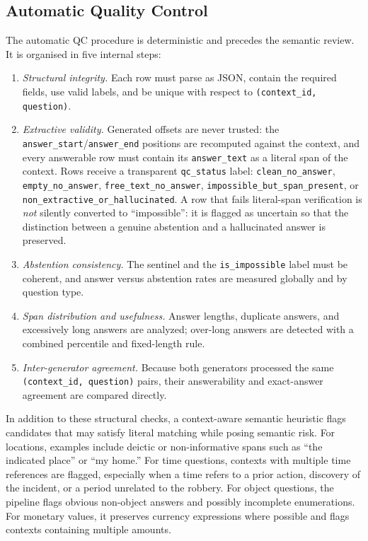 \documentclass[graybox]{SNmult}
\begin{document}
\subsection{Automatic Quality Control}

The automatic QC procedure is deterministic and precedes the semantic review.
It is organised in five internal steps: %

\begin{enumerate}
\item \textit{Structural integrity.} Each row must parse as JSON, contain the
  required fields, use valid labels, and be unique with respect to
  \texttt{(context\_id, question)}.
\item \textit{Extractive validity.} Generated offsets are never trusted: the
  \texttt{answer\_start}/\texttt{answer\_end} positions are recomputed against
  the context, and every answerable row must contain its
  \texttt{answer\_text} as a literal span of the context. Rows receive a
  transparent \texttt{qc\_status} label: \texttt{clean\_no\_answer},
  \texttt{empty\_no\_answer}, \texttt{free\_text\_no\_answer},
  \texttt{impossible\_but\_span\_present}, or
  \texttt{non\_extractive\_or\_hallucinated}. A row that fails literal-span
  verification is \emph{not} silently converted to ``impossible'': it is
  flagged as uncertain so that the distinction between a genuine abstention
  and a hallucinated answer is preserved.
\item \textit{Abstention consistency.} The sentinel and the
  \texttt{is\_impossible} label must be coherent, and answer versus abstention
  rates are measured globally and by question type.
\item \textit{Span distribution and usefulness.} Answer lengths, duplicate
  answers, and excessively long answers are analyzed; over-long answers are
  detected with a combined percentile and fixed-length rule.
\item \textit{Inter-generator agreement.} Because both generators processed the
  same \texttt{(context\_id, question)} pairs, their answerability and
  exact-answer agreement are compared directly.
\end{enumerate}

In addition to these structural checks, a context-aware semantic heuristic
flags candidates that may satisfy literal matching while posing semantic risk.
For locations, examples include deictic or non-informative spans such as ``the
indicated place'' or ``my home.'' For time questions, contexts with multiple
time references are flagged, especially when a time refers to a prior action,
discovery of the incident, or a period unrelated to the robbery. For object
questions, the pipeline flags obvious non-object answers and possibly
incomplete enumerations. For monetary values, it preserves currency
expressions where possible and flags contexts containing multiple
amounts.
\end{document}
